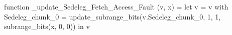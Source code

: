 function _update_Sedeleg_Fetch_Access_Fault (v, x) = let v = { v with Sedeleg_chunk_0 = update_subrange_bits(v.Sedeleg_chunk_0, 1, 1, subrange_bits(x, 0, 0)) } in
  v
